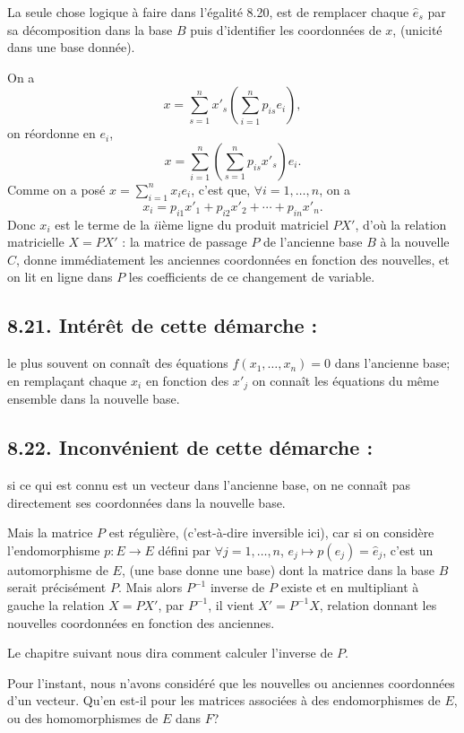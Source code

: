La seule chose logique à faire dans l'égalité 8.20, est de remplacer chaque $\hat e_s$ par sa décomposition dans la base $B$ puis d'identifier les coordonnées de $x$, (unicité dans une base donnée).

On a
\[
x=\sum_{s=1}^n x'_s\left(\sum_{i=1}^n p_{is}e_i\right),
\]
on réordonne en $e_i$,
\[
x=\sum_{i=1}^n\left(\sum_{s=1}^n p_{is}x'_s\right)e_i.
\]
Comme on a posé $x=\sum_{i=1}^n x_ie_i$, c'est que, $\forall i=1,\ldots,n$, on a
\[
x_i=p_{i1}x'_1+p_{i2}x'_2+\cdots+p_{in}x'_n.
\]
Donc $x_i$ est le terme de la $i$ième ligne du produit matriciel $PX'$, d'où la relation matricielle $X=PX'$ : la matrice de passage $P$ de l'ancienne base $B$ à la nouvelle $C$, donne immédiatement les anciennes coordonnées en fonction des nouvelles, et on lit en ligne dans $P$ les coefficients de ce changement de variable.

\subsection*{8.21. Intérêt de cette démarche :}
le plus souvent on connaît des équations $f(x_1,\ldots,x_n)=0$ dans l'ancienne base; en remplaçant chaque $x_i$ en fonction des $x'_j$ on connaît les équations du même ensemble dans la nouvelle base.

\subsection*{8.22. Inconvénient de cette démarche :}
si ce qui est connu est un vecteur dans l'ancienne base, on ne connaît pas directement ses coordonnées dans la nouvelle base.

Mais la matrice $P$ est régulière, (c'est-à-dire inversible ici), car si on considère l'endomorphisme $p:E\longrightarrow E$ défini par $\forall j=1,\ldots,n$, $e_j\mapsto p(e_j)=\hat e_j$, c'est un automorphisme de $E$, (une base donne une base) dont la matrice dans la base $B$ serait précisément $P$. Mais alors $P^{-1}$ inverse de $P$ existe et en multipliant à gauche la relation $X=PX'$, par $P^{-1}$, il vient $X'=P^{-1}X$, relation donnant les nouvelles coordonnées en fonction des anciennes.

Le chapitre suivant nous dira comment calculer l'inverse de $P$.

Pour l'instant, nous n'avons considéré que les nouvelles ou anciennes coordonnées d'un vecteur. Qu'en est-il pour les matrices associées à des endomorphismes de $E$, ou des homomorphismes de $E$ dans $F$?

